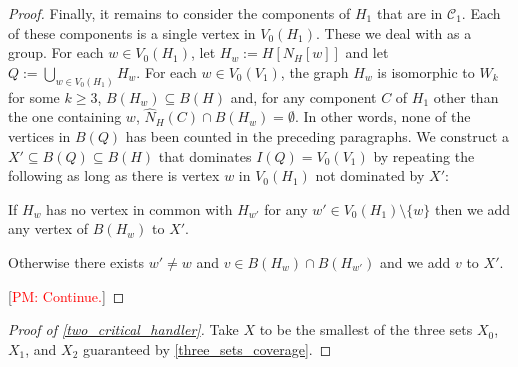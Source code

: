 \documentclass[12pt]{article}
\theoremstyle{definition}
\newcommand{\pat}[1]{[\textcolor{red}{PM: #1}]}
\begin{document}
\begin{proof}


  Finally, it remains to consider the components of $H_1$ that are in $\mathcal{C}_1$. Each of these components is a single vertex in $V_0(H_1)$. These we deal with as a group. For each $w\in V_0(H_1)$, let $H_w:=H[N_H[w]]$ and let $Q:=\bigcup_{w\in V_0(H_1)} H_w$.  For each $w\in V_0(V_1)$, the graph $H_w$ is isomorphic to $W_k$ for some $k\ge 3$, $B(H_w)\subseteq B(H)$ and, for any component $C$ of $H_1$ other than the one containing $w$, $\widehat{N}_H(C)\cap B(H_w)=\emptyset$. In other words, none of the vertices in $B(Q)$ has been counted in the preceding paragraphs.  We construct a $X'\subseteq B(Q)\subseteq B(H)$ that dominates $I(Q)=V_0(V_1)$ by repeating the following as long as there is vertex $w$ in $V_0(H_1)$ not dominated by $X'$:
  \begin{compactenum}
    \item  If $H_w$ has no vertex in common with $H_{w'}$ for any $w'\in V_0(H_1)\setminus\{w\}$ then we add any vertex of $B(H_w)$ to $X'$.
    \item Otherwise there exists $w'\neq w$ and $v\in B(H_w)\cap B(H_{w'})$ and we add $v$ to $X'$.
  \end{compactenum}

  \pat{Continue.}
\end{proof}

\begin{proof}[Proof of \cref{two_critical_handler}]
  Take $X$ to be the smallest of the three sets $X_0$, $X_1$, and $X_2$ guaranteed by \cref{three_sets_coverage}.
\end{proof}
\end{document}
